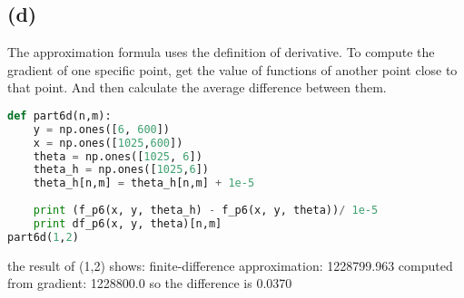 \documentclass{article}
\begin{document}
\subsection*{(d)}
The approximation formula uses the definition of derivative. To compute the gradient of one specific point, get the value of functions of another point close to that point. And then calculate the average difference between them. 
\Large\begin{lstlisting}[basicstyle=\ttfamily,language=Python]
def part6d(n,m):
    y = np.ones([6, 600])
    x = np.ones([1025,600])
    theta = np.ones([1025, 6])
    theta_h = np.ones([1025,6])
    theta_h[n,m] = theta_h[n,m] + 1e-5
    
    print (f_p6(x, y, theta_h) - f_p6(x, y, theta))/ 1e-5
    print df_p6(x, y, theta)[n,m]
part6d(1,2)
\end{lstlisting}

\noindent the result of (1,2) shows: \newline
finite-difference approximation: 1228799.963 \newline
computed from gradient: 1228800.0 \newline
so the difference is 0.0370


\Large\color{black}
\end{document}
